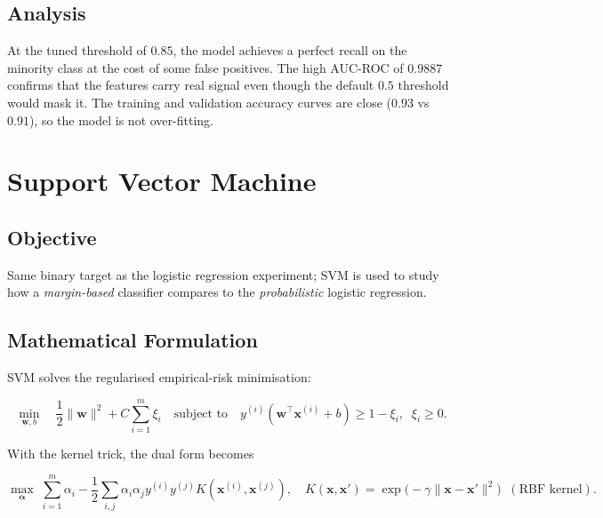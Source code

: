 \documentclass[11pt,a4paper]{article}
\begin{document}
\subsection{Analysis}
At the tuned threshold of $0.85$, the model achieves a perfect recall on the
minority class at the cost of some false positives. The high AUC-ROC of
$0.9887$ confirms that the features carry real signal even though the
default $0.5$ threshold would mask it. The training and validation accuracy
curves are close ($0.93$ vs $0.91$), so the model is not over-fitting.

\newpage
\section{Support Vector Machine}

\subsection{Objective}
Same binary target as the logistic regression experiment; SVM is used to
study how a \emph{margin-based} classifier compares to the \emph{probabilistic}
logistic regression.

\subsection{Mathematical Formulation}

SVM solves the regularised empirical-risk minimisation:

\begin{equation}
    \min_{\mathbf{w}, b} \quad
    \frac{1}{2} \| \mathbf{w} \|^{2} + C \sum_{i=1}^{m} \xi_i
    \quad \text{subject to} \quad
    y^{(i)} (\mathbf{w}^{\top} \mathbf{x}^{(i)} + b) \ge 1 - \xi_i, \;\; \xi_i \ge 0.
\end{equation}

With the kernel trick, the dual form becomes

\begin{equation}
    \max_{\boldsymbol{\alpha}} \;
    \sum_{i=1}^{m} \alpha_i
    - \frac{1}{2} \sum_{i,j} \alpha_i \alpha_j y^{(i)} y^{(j)} K(\mathbf{x}^{(i)}, \mathbf{x}^{(j)}),
    \quad
    K(\mathbf{x}, \mathbf{x}') = \exp\!\bigl( -\gamma \| \mathbf{x} - \mathbf{x}' \|^{2} \bigr)
    \;\; (\text{RBF kernel}).
\end{equation}
\end{document}

